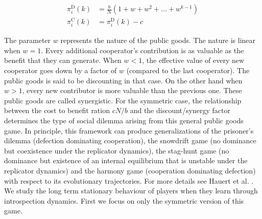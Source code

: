 \documentclass[11pt]{article}
\theoremstyle{plainCl1}
\theoremstyle{plainCl2}
\newcommand{\C}{\mathrm{C}}
\newcommand{\D}{\mathrm{D}}
\begin{document}
\begin{align}
\pi^{\D}_i(k) &= \frac{b}{N}(1 + w + w^2 + ... + w^{k-1}) \\[15pt]
\pi^{\C}_i(k) &= \pi^{\D}_i(k) - c
\label{Eq:payoff-synergistic-symmetric}
\end{align} 

\noindent The parameter $w$ represents the nature of the public goods. The nature is linear when $w = 1$. Every additional cooperator's contribution is as valuable as the benefit that they can generate. When $w < 1$, the effective value of every new cooperator goes down by a factor of $w$ (compared to the last cooperator). The public goods is said to be discounting in that case. On the other hand when $w > 1$, every new contributor is more valuable than the previous one. These public goods are called synergistic. For the symmetric case, the relationship between the cost to benefit ration $cN/b$ and the discount/synergy factor determines the type of social dilemma arising from this general public goods game. In principle, this framework can produce generalizations of the prisoner's dilemma (defection dominating cooperation), the snowdrift game (no dominance but coexistence under the replicator dynamics), the stag-hunt game (no dominance but existence of an internal equilibrium that is unstable under the replicator dynamics) and the harmony game (cooperation dominating defection) with respect to its evolutionary trajectories. For more details see Hauert et al. \cite{Hauert:JTB:2006a}. We study the long term stationary behaviour of players when they learn through introspection dynamics. First we focus on only the symmetric version of this game. 
\\ \\ 
\end{document}
